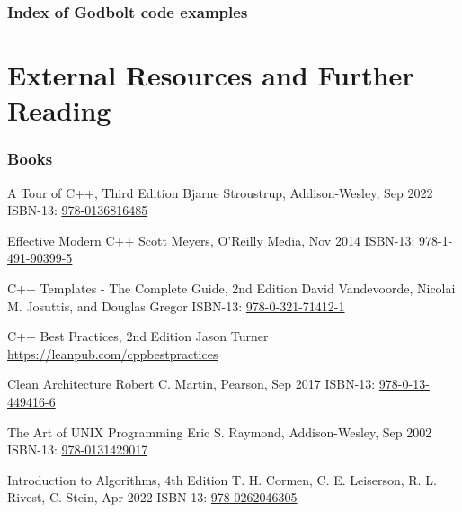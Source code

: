 \documentclass[compress]{beamer}
\begin{document}
\begin{frame}
  \frametitle{Index of Godbolt code examples}
  \listofgodbolt
\end{frame}

\section*{External Resources and Further Reading}

\begin{frame}
  \frametitle{Books}
  \begin{thebibliography}{10}
    \scriptsize
    \beamertemplatebookbibitems

    \bibitem{} A Tour of C++, Third Edition
    \newblock  Bjarne Stroustrup, Addison-Wesley, Sep 2022
    \newblock  ISBN-13: \href{https://learning.oreilly.com/library/view/a-tour-of/9780136823575/}{978-0136816485}

    \bibitem{} Effective Modern C++
    \newblock  Scott Meyers, O'Reilly Media, Nov 2014
    \newblock  ISBN-13: \href{https://learning.oreilly.com/library/view/effective-modern-c/9781491908419/}{978-1-491-90399-5}

    \bibitem{} C++ Templates - The Complete Guide, 2nd Edition
    \newblock  David Vandevoorde, Nicolai M. Josuttis, and Douglas Gregor
    \newblock  ISBN-13: \href{https://learning.oreilly.com/library/view/c-templates-the/9780134778808/}{978-0-321-71412-1}

    \bibitem{} C++ Best Practices, 2nd Edition
    \newblock  Jason Turner
    \newblock  \url{https://leanpub.com/cppbestpractices}

    \bibitem{} Clean Architecture
    \newblock  Robert C. Martin, Pearson, Sep 2017
    \newblock  ISBN-13: \href{https://learning.oreilly.com/library/view/clean-architecture-a/9780134494272/}{978-0-13-449416-6}

    \bibitem{} The Art of UNIX Programming
    \newblock  Eric S. Raymond, Addison-Wesley, Sep 2002
    \newblock  ISBN-13: \href{https://learning.oreilly.com/library/view/the-art-of/0131429019/}{978-0131429017}

    \bibitem{} Introduction to Algorithms, 4th Edition
    \newblock  T. H. Cormen, C. E. Leiserson, R. L. Rivest, C. Stein, Apr 2022
    \newblock  ISBN-13: \href{https://mitpress.mit.edu/9780262046305/introduction-to-algorithms/}{978-0262046305}
  \end{thebibliography}
\end{frame}
\end{document}
